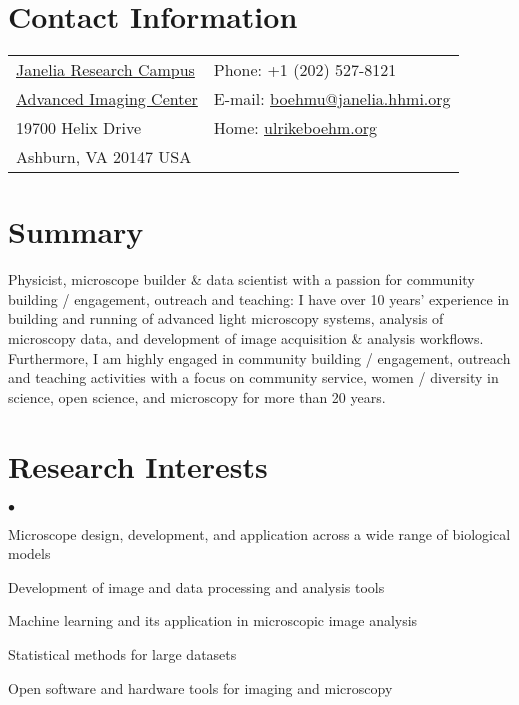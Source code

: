 \documentclass[margin,line]{res}
\newenvironment{list2}{
  \begin{list}{$\bullet$}{%
      \setlength{\itemsep}{0in}
      \setlength{\parsep}{0in} \setlength{\parskip}{0in}
      \setlength{\topsep}{0in} \setlength{\partopsep}{0in} 
      \setlength{\leftmargin}{0.2in}}}{\end{list}}
\begin{document}


\begin{resume}


\section{\sc Contact Information}
\vspace{.05in}
\begin{tabular}{@{}p{3.5in}p{4in}}
 \href{https://www.janelia.org/}{Janelia Research Campus}     & {Phone:} +1 (202) 527-8121 \\            
 \href{https://www.aicjanelia.org/}{Advanced Imaging Center}   & { E-mail:}   \href{mailto:boehmu@janelia.hhmi.org}{boehmu@janelia.hhmi.org}  \\         
19700 Helix Drive & { Home:}  \href{http://ulrikeboehm.org/}{ulrikeboehm.org}\\       
Ashburn, VA  20147 USA  &  \\     
\end{tabular}


\section{\sc Summary}
Physicist, microscope builder \& data scientist with a  passion for community building / engagement, outreach and teaching: I have over 10 years’ experience in building and running of advanced light microscopy systems, analysis of microscopy data, and development of  image acquisition \& analysis workflows. Furthermore, I am highly engaged in community building / engagement, outreach and teaching activities with a focus on community service, women / diversity in science, open science, and microscopy for more than 20 years.


\section{\sc Research Interests}
\begin{list2}
\item Microscope design, development, and application across a wide range of biological models 
\item Development of image and data processing and analysis tools
\item Machine learning and its application in microscopic image analysis
\item Statistical methods for large datasets
\item Open software and hardware tools for imaging and microscopy
\end{list2}


\end{resume}
\end{document}

